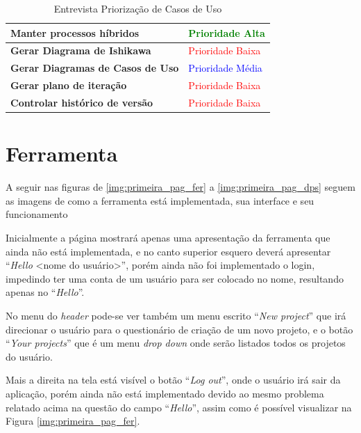 \begin{table}[H]
\begin{tabular}{|p{7cm}|p{3cm}|}
\textbf{Manter processos híbridos} &
\textcolor{green}{Prioridade Alta}
\\ \hline
\textbf{Gerar Diagrama de Ishikawa} &
\textcolor{red}{Prioridade Baixa}
\\ \hline
\textbf{Gerar Diagramas de Casos de Uso} &
\textcolor{blue}{Prioridade Média}
\\ \hline
\textbf{Gerar plano de iteração} &
\textcolor{red}{Prioridade Baixa}
\\ \hline
\textbf{Controlar histórico de versão} &
\textcolor{red}{Prioridade Baixa}
\\ \hline
\end{tabular}
\caption{Entrevista Priorização de Casos de Uso}
\label{tab:entrevista_priorizacao_uc}
\end{table}

\chapter{Ferramenta}

A seguir nas figuras de \ref{img:primeira_pag_fer} a \ref{img:primeira_pag_dps} seguem as imagens de como a ferramenta está implementada, sua interface e seu funcionamento

Inicialmente a página mostrará apenas uma apresentação da ferramenta que ainda não está implementada, e no canto superior esquero deverá apresentar ``\textit{Hello} <nome do usuário>'', porém ainda não foi implementado o login, impedindo ter uma conta de um usuário para ser colocado no nome, resultando apenas no ``\textit{Hello}''.

No menu do \textit{header} pode-se ver também um menu escrito ``\textit{New project}'' que irá direcionar o usuário para o questionário de criação de um novo projeto, e o botão ``\textit{Your projects}'' que é um menu \textit{drop down} onde serão listados todos os projetos do usuário.

Mais a direita na tela está visível o botão ``\textit{Log out}'', onde o usuário irá sair da aplicação, porém ainda não está implementado devido ao mesmo problema relatado acima na questão do campo ``\textit{Hello}'', assim como é possível visualizar na Figura \ref{img:primeira_pag_fer}.

